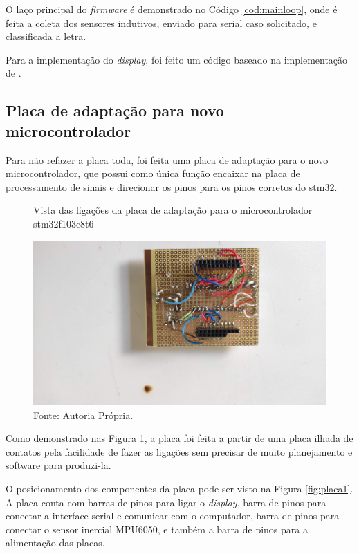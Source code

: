 O laço principal do \textit{firmware} é demonstrado no Código \ref{cod:mainloop}, onde é feita a coleta dos sensores indutivos, enviado para serial caso solicitado, e classificada a letra.

Para a implementação do \textit{display}, foi feito um código baseado na implementação de \cite{gihutDisplay}.

\subsection{Placa de adaptação para novo microcontrolador}
Para não refazer a placa toda, foi feita uma placa de adaptação para o novo microcontrolador, que possui como única função encaixar na placa de processamento de sinais e direcionar os pinos para os pinos corretos do stm32.

\begin{figure}[H]
	\vspace{4mm}
	\centering
	\caption{Vista das ligações da placa de adaptação para o microcontrolador stm32f103c8t6}
	\label{fig:placa2}
	\includegraphics[scale=0.12, trim={20cm 2cm 45cm 15cm}, clip]{imagens/placa2}
	\caption*{Fonte: Autoria Própria.}
\end{figure}
Como demonstrado nas Figura \ref{fig:placa2}, a placa foi feita a partir de uma placa ilhada de contatos pela facilidade de fazer as ligações sem precisar de muito planejamento e software para produzi-la.

O posicionamento dos componentes da placa pode ser visto na Figura \ref{fig:placa1}. A placa conta com barras de pinos para ligar o \textit{display}, barra de pinos para conectar a interface serial e comunicar com o computador, barra de pinos para conectar o sensor inercial MPU6050, e também a barra de pinos para a alimentação das placas.

